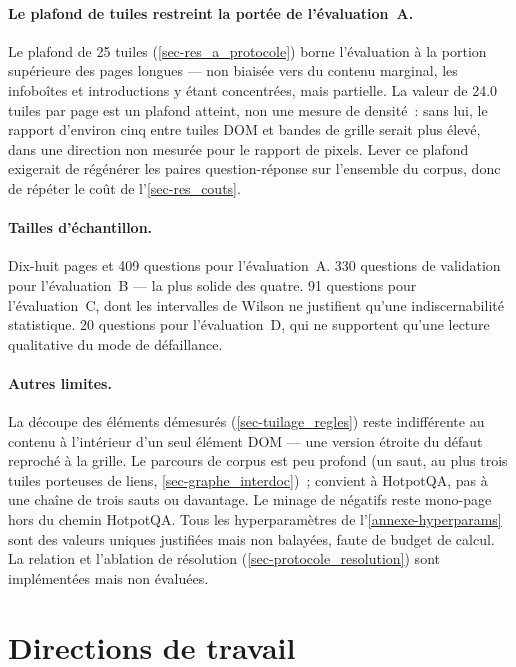 \paragraph{Le plafond de tuiles restreint la portée de l'évaluation~A.}
\label{sec-res_limites_plafond}
Le plafond de \num{25} tuiles (\cref{sec-res_a_protocole}) borne l'évaluation à
la portion supérieure des pages longues --- non biaisée vers du contenu
marginal, les infoboîtes et introductions y étant concentrées, mais partielle.
La valeur de \num{24.0} tuiles par page est un plafond atteint, non une mesure
de densité~: sans lui, le rapport d'environ cinq entre tuiles DOM et bandes de
grille serait plus élevé, dans une direction non mesurée pour le rapport de
pixels. Lever ce plafond exigerait de régénérer les paires question-réponse
sur l'ensemble du corpus, donc de répéter le coût de l'\cref{sec-res_couts}.

\paragraph{Tailles d'échantillon.} Dix-huit pages et \num{409} questions pour
l'évaluation~A. \num{330} questions de validation pour l'évaluation~B --- la
plus solide des quatre. \num{91} questions pour l'évaluation~C, dont les
intervalles de Wilson ne justifient qu'une indiscernabilité statistique.
\num{20} questions pour l'évaluation~D, qui ne supportent qu'une lecture
qualitative du mode de défaillance.

\paragraph{Autres limites.} La découpe des éléments démesurés
(\cref{sec-tuilage_regles}) reste indifférente au contenu à l'intérieur d'un
seul élément DOM --- une version étroite du défaut reproché à la grille. Le
parcours de corpus est peu profond (un saut, au plus trois tuiles porteuses de
liens, \cref{sec-graphe_interdoc})~; convient à HotpotQA, pas à une chaîne de
trois sauts ou davantage. Le minage de négatifs reste mono-page hors du chemin
HotpotQA. Tous les hyperparamètres de l'\cref{annexe-hyperparams} sont des
valeurs uniques justifiées mais non balayées, faute de budget de calcul. La
relation  et l'ablation de résolution
(\cref{sec-protocole_resolution}) sont implémentées mais non évaluées.

\section{Directions de travail}
\label{sec-res_futur}

